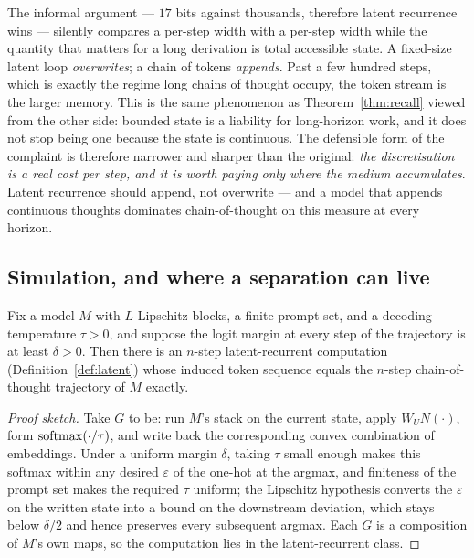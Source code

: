 \begin{remark}
\label{rem:reversal}
The informal argument --- $17$ bits against thousands, therefore latent
recurrence wins --- silently compares a per-step width with a per-step width
while the quantity that matters for a long derivation is total accessible state.
A fixed-size latent loop \emph{overwrites}; a chain of tokens \emph{appends}.
Past a few hundred steps, which is exactly the regime long chains of thought
occupy, the token stream is the larger memory. This is the same phenomenon as
Theorem~\ref{thm:recall} viewed from the other side: bounded state is a
liability for long-horizon work, and it does not stop being one because the state
is continuous. The defensible form of the complaint is therefore narrower and
sharper than the original: \emph{the discretisation is a real cost per step, and
it is worth paying only where the medium accumulates}. Latent recurrence should
append, not overwrite --- and a model that appends continuous thoughts dominates
chain-of-thought on this measure at every horizon.
\end{remark}

\subsection{Simulation, and where a separation can live}
\label{sec:time-sep}

\begin{theorem}
\label{thm:sim}
Fix a model $M$ with $L$-Lipschitz blocks, a finite prompt set, and a decoding
temperature $\tau > 0$, and suppose the logit margin at every step of the
trajectory is at least $\delta > 0$. Then there is an $n$-step latent-recurrent
computation (Definition~\ref{def:latent}) whose induced token sequence equals
the $n$-step chain-of-thought trajectory of $M$ exactly.
\end{theorem}

\begin{proof}[Proof sketch]
Take $G$ to be: run $M$'s stack on the current state, apply $W_U N(\cdot)$, form
$\mathrm{softmax}(\cdot/\tau)$, and write back the corresponding convex combination of
embeddings. Under a uniform margin $\delta$, taking $\tau$ small enough makes
this softmax within any desired $\varepsilon$ of the one-hot at the argmax, and
finiteness of the prompt set makes the required $\tau$ uniform; the Lipschitz
hypothesis converts the $\varepsilon$ on the written state into a bound on the
downstream deviation, which stays below $\delta/2$ and hence preserves every
subsequent argmax. Each $G$ is a composition of $M$'s own maps, so the
computation lies in the latent-recurrent class.
\end{proof}

